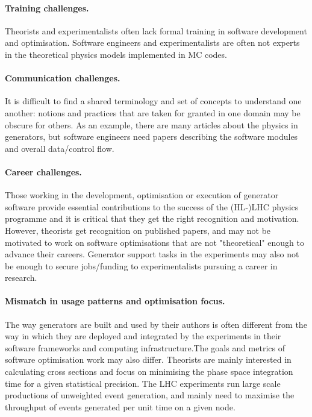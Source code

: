 \documentclass[11pt,a4paper]{article}
\begin{document}
\paragraph{Training challenges.} Theorists and experimentalists often
lack formal training in software development and optimisation. Software
engineers and experimentalists are often not experts in the theoretical
physics models implemented in MC codes.

\paragraph{Communication challenges.} It is difficult to find a shared
terminology and set of concepts to understand one another: notions and
practices that are taken for granted in one domain may be obscure for
others. As an example, there are many articles about the physics in
generators, but software engineers need papers describing the software
modules and overall data/control flow.

\paragraph{Career challenges.} Those working in the development, optimisation or
execution of generator software provide essential contributions to the
success of the (HL-)LHC physics programme and it is critical that they
get the right recognition and motivation. However, theorists get
recognition on published papers, and may not be motivated to work on
software optimisations that are not "theoretical" enough to advance
their careers. Generator support tasks in the experiments may also not
be enough to secure jobs/funding to experimentalists pursuing a career
in research.

\paragraph{Mismatch in usage patterns and optimisation focus.} The way
generators are built and used by their authors is often different from
the way in which they are deployed and integrated by the experiments in
their software frameworks and computing infrastructure.The goals and
metrics of software optimisation work may also differ. Theorists are
mainly interested in calculating cross sections and focus on minimising
the phase space integration time for a given statistical precision. The
LHC experiments run large scale productions of unweighted event
generation, and mainly need to maximise the throughput of events
generated per unit time on a given node.
\end{document}
